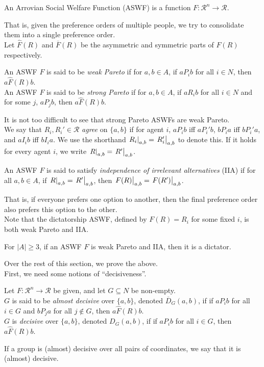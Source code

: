 	\begin{fdef}
		An Arrovian Social Welfare Function (ASWF) is a function $F : \mathcal{R}^n \to \mathcal{R}$.
	\end{fdef}
	That is, given the preference orders of multiple people, we try to consolidate them into a single preference order.\\
	Let $\hat{F}(R)$ and $\overline{F}(R)$ be the asymmetric and symmetric parts of $F(R)$ respectively.

	\begin{fdef}[Pareto]
		An ASWF $F$ is said to be \emph{weak Pareto} if for $a,b \in A$, if $a P_i b$ for all $i \in N$, then $a \hat{F}(R) b$.\\
		An ASWF $F$ is said to be \emph{strong Pareto} if for $a,b \in A$, if $a R_i b$ for all $i \in N$ and for some $j$, $a P_j b$, then $a \hat{F}(R) b$.
	\end{fdef}

	It is not too difficult to see that strong Pareto ASWFs are weak Pareto.\\
	We say that $R_i,R_i'\in\mathcal{R}$ \emph{agree} on $\{a,b\}$ if for agent $i$, $a P_i b$ iff $a P_i' b$, $b P_i a$ iff $b P_i' a$, and $a I_i b$ iff $b I_i a$. We use the shorthand $\left.R_i\right|_{a,b} = \left.R_i'\right|_{a,b}$ to denote this. If it holds for every agent $i$, we write $\left.R\right|_{a,b} = \left.R'\right|_{a,b}$.

	\begin{fdef}
		An ASWF $F$ is said to satisfy \emph{independence of irrelevant alternatives} (IIA) if for all $a,b \in A$, if $\left.R\right|_{a,b} = \left.R'\right|_{a,b}$, then $\left.F(R)\right|_{a,b} = \left.F(R')\right|_{a,b}$.
	\end{fdef}
	That is, if everyone prefers one option to another, then the final preference order also prefers this option to the other.\\
	Note that the dictatorship ASWF, defined by $F(R) = R_i$ for some fixed $i$, is both weak Pareto and IIA.

	\begin{ftheo}[Arrow]
		\label{arrow}
		For $|A| \ge 3$, if an ASWF $F$ is weak Pareto and IIA, then it is a dictator.
	\end{ftheo}

	Over the rest of this section, we prove the above.\\
	First, we need some notions of ``decisiveness''.

	\begin{fdef}
		Let $F : \mathcal{R}^n \to \mathcal{R}$ be given, and let $G \subseteq N$ be non-empty.\\
		$G$ is said to be \emph{almost decisive} over $\{a,b\}$, denoted $\overline{D}_G(a,b)$, if if $a P_i b$ for all $i \in G$ and $b P_j a$ for all $j \not\in G$, then $a \hat{F}(R) b$. \\
		$G$ is \emph{decisive} over $\{a,b\}$, denoted $D_G(a,b)$, if if $a P_i b$ for all $i \in G$, then $a \hat{F}(R) b$.
	\end{fdef}
	If a group is (almost) decisive over all pairs of coordinates, we say that it is (almost) decisive.

